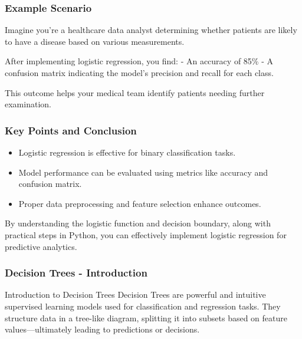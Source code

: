 \documentclass[aspectratio=169]{beamer}
\begin{document}
\begin{frame}
    \frametitle{Example Scenario}
    Imagine you're a healthcare data analyst determining whether patients are likely to have a disease based on various measurements.

    After implementing logistic regression, you find:
    - An accuracy of 85\%
    - A confusion matrix indicating the model's precision and recall for each class.
    
    This outcome helps your medical team identify patients needing further examination.
\end{frame}

\begin{frame}
    \frametitle{Key Points and Conclusion}
    \begin{itemize}
        \item Logistic regression is effective for binary classification tasks.
        \item Model performance can be evaluated using metrics like accuracy and confusion matrix.
        \item Proper data preprocessing and feature selection enhance outcomes.
    \end{itemize}

    By understanding the logistic function and decision boundary, along with practical steps in Python, you can effectively implement logistic regression for predictive analytics.
\end{frame}

\begin{frame}[fragile]
    \frametitle{Decision Trees - Introduction}
    \begin{block}{Introduction to Decision Trees}
        Decision Trees are powerful and intuitive supervised learning models used for classification and regression tasks. They structure data in a tree-like diagram, splitting it into subsets based on feature values—ultimately leading to predictions or decisions. 
    \end{block}
\end{frame}
\end{document}
